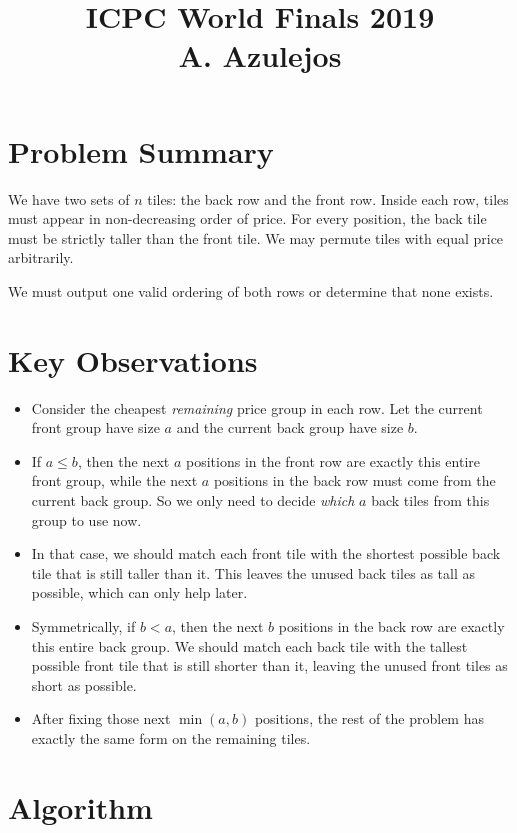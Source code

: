 \documentclass[11pt]{article}
\title{ICPC World Finals 2019\\A. Azulejos}
\author{}
\date{}
\begin{document}
\maketitle

\section*{Problem Summary}

We have two sets of $n$ tiles: the back row and the front row. Inside each row, tiles must appear in non-decreasing order of price. For every position, the back tile must be strictly taller than the front tile. We may permute tiles with equal price arbitrarily.

We must output one valid ordering of both rows or determine that none exists.

\section*{Key Observations}

\begin{itemize}[leftmargin=*]
    \item Consider the cheapest \emph{remaining} price group in each row. Let the current front group have size $a$ and the current back group have size $b$.
    \item If $a \le b$, then the next $a$ positions in the front row are exactly this entire front group, while the next $a$ positions in the back row must come from the current back group. So we only need to decide \emph{which} $a$ back tiles from this group to use now.
    \item In that case, we should match each front tile with the shortest possible back tile that is still taller than it. This leaves the unused back tiles as tall as possible, which can only help later.
    \item Symmetrically, if $b < a$, then the next $b$ positions in the back row are exactly this entire back group. We should match each back tile with the tallest possible front tile that is still shorter than it, leaving the unused front tiles as short as possible.
    \item After fixing those next $\min(a,b)$ positions, the rest of the problem has exactly the same form on the remaining tiles.
\end{itemize}

\section*{Algorithm}
\end{document}
